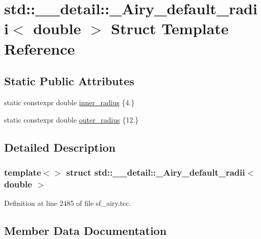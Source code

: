 \hypertarget{structstd_1_1____detail_1_1__Airy__default__radii_3_01double_01_4}{}\section{std\+:\+:\+\_\+\+\_\+detail\+:\+:\+\_\+\+Airy\+\_\+default\+\_\+radii$<$ double $>$ Struct Template Reference}
\label{structstd_1_1____detail_1_1__Airy__default__radii_3_01double_01_4}
\subsection*{Static Public Attributes}
\begin{DoxyCompactItemize}
\item 
static constexpr double \hyperlink{structstd_1_1____detail_1_1__Airy__default__radii_3_01double_01_4_a1c16ae812de7fce0a39bc3b094767b87}{inner\+\_\+radius} \{4.\}
\item 
static constexpr double \hyperlink{structstd_1_1____detail_1_1__Airy__default__radii_3_01double_01_4_a0d0c981d84c034afb18aa533bd6a9a52}{outer\+\_\+radius} \{12.\}
\end{DoxyCompactItemize}


\subsection{Detailed Description}
\subsubsection*{template$<$$>$\newline
struct std\+::\+\_\+\+\_\+detail\+::\+\_\+\+Airy\+\_\+default\+\_\+radii$<$ double $>$}



Definition at line 2485 of file sf\+\_\+airy.\+tcc.



\subsection{Member Data Documentation}
\mbox{\label{structstd_1_1____detail_1_1__Airy__default__radii_3_01double_01_4_a1c16ae812de7fce0a39bc3b094767b87}} 
